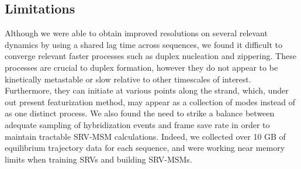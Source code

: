 \documentclass[journal=jpcbfk,manuscript=article]{achemso}
\begin{document}



\subsection{Limitations}

Although we were able to obtain improved resolutions on several relevant dynamics by using a shared lag time across sequences, we found it difficult to converge relevant faster processes such as duplex nucleation and zippering. These processes are crucial to duplex formation, however they do not appear to be kinetically metastable or slow relative to other timescales of interest. Furthermore, they can initiate at various points along the strand, which, under out present featurization method, may appear as a collection of modes instead of as one distinct process. We also found the need to strike a balance between adequate sampling of hybridization events and frame save rate in order to maintain tractable SRV-MSM calculations. Indeed, we collected over 10 GB of equilibrium trajectory data for each sequence, and were working near memory limits when training SRVs and building SRV-MSMs.
\end{document}
